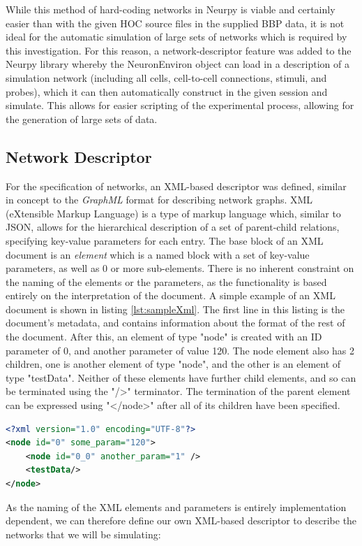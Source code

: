 While this method of hard-coding networks in Neurpy is viable and certainly easier than with the given HOC source files in the supplied BBP data, it is not ideal for the automatic simulation of large sets of networks which is required by this investigation. For this reason, a network-descriptor feature was added to the Neurpy library whereby the NeuronEnviron object can load in a description of a simulation network (including all cells, cell-to-cell connections, stimuli, and probes), which it can then automatically construct in the given session and simulate. This allows for easier scripting of the experimental process, allowing for the generation of large sets of data.



\subsection{Network Descriptor}
For the specification of networks, an XML-based descriptor was defined, similar in concept to the \emph{GraphML} format for describing network graphs. XML (eXtensible Markup Language) is a type of markup language which, similar to JSON, allows for the hierarchical description of a set of parent-child relations, specifying key-value parameters for each entry. The base block of an XML document is an \emph{element} which is a named block with a set of key-value parameters, as well as 0 or more sub-elements. There is no inherent constraint on the naming of the elements or the parameters, as the functionality is based entirely on the interpretation of the document. A simple example of an XML document is shown in listing \ref{lst:sampleXml}. The first line in this listing is the document's metadata, and contains information about the format of the rest of the document. After this, an element of type "node" is created with an ID parameter of 0, and another parameter of value 120. The node element also has 2 children, one is another element of type "node", and the other is an element of type "testData". Neither of these elements have further child elements, and so can be terminated using the "/>" terminator. The termination of the parent element can be expressed using "</node>" after all of its children have been specified.
\begin{lstlisting}[language=XML,label=lst:sampleXml]
<?xml version="1.0" encoding="UTF-8"?>
<node id="0" some_param="120">
    <node id="0_0" another_param="1" />
    <testData/>
</node>
\end{lstlisting}
As the naming of the XML elements and parameters is entirely implementation dependent, we can therefore define our own XML-based descriptor to describe the networks that we will be simulating:
